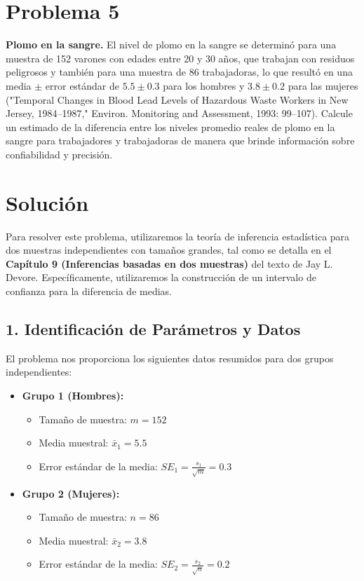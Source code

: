 \documentclass[12pt]{article}
\begin{document}
\section*{Problema 5}
\textbf{Plomo en la sangre.} El nivel de plomo en la sangre se determinó para una muestra de 152 varones con edades entre 20 y 30 años, que trabajan con residuos peligrosos y también para una muestra de 86 trabajadoras, lo que resultó en una media $\pm$ error estándar de $5.5 \pm 0.3$ para los hombres y $3.8 \pm 0.2$ para las mujeres ("Temporal Changes in Blood Lead Levels of Hazardous Waste Workers in New Jersey, 1984–1987," Environ. Monitoring and Assessment, 1993: 99–107). Calcule un estimado de la diferencia entre los niveles promedio reales de plomo en la sangre para trabajadores y trabajadoras de manera que brinde información sobre confiabilidad y precisión.

\section*{Solución}
Para resolver este problema, utilizaremos la teoría de inferencia estadística para dos muestras independientes con tamaños grandes, tal como se detalla en el \textbf{Capítulo 9 (Inferencias basadas en dos muestras)} del texto de Jay L. Devore. Específicamente, utilizaremos la construcción de un intervalo de confianza para la diferencia de medias.

\subsection*{1. Identificación de Parámetros y Datos}
El problema nos proporciona los siguientes datos resumidos para dos grupos independientes:

\begin{itemize}
    \item \textbf{Grupo 1 (Hombres):}
    \begin{itemize}
        \item Tamaño de muestra: $m = 152$
        \item Media muestral: $\bar{x}_1 = 5.5$
        \item Error estándar de la media: $SE_1 = \frac{s_1}{\sqrt{m}} = 0.3$
    \end{itemize}
    
    \item \textbf{Grupo 2 (Mujeres):}
    \begin{itemize}
        \item Tamaño de muestra: $n = 86$
        \item Media muestral: $\bar{x}_2 = 3.8$
        \item Error estándar de la media: $SE_2 = \frac{s_2}{\sqrt{n}} = 0.2$
    \end{itemize}
\end{itemize}
\end{document}
